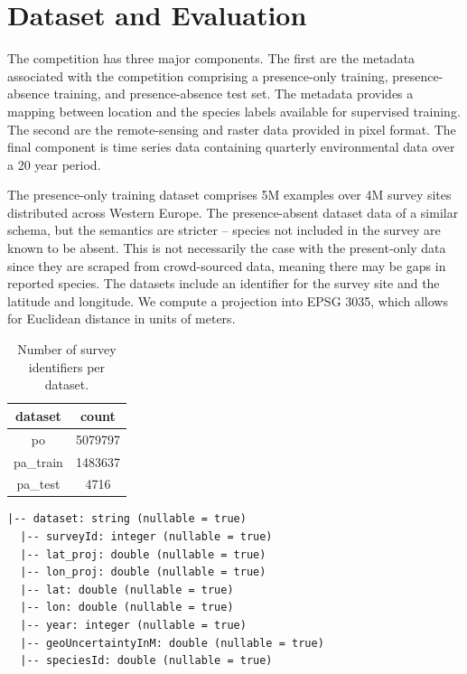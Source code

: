 \section{Dataset and Evaluation}

The competition has three major components. 
The first are the metadata associated with the competition comprising a presence-only training, presence-absence training, and presence-absence test set. 
The metadata provides a mapping between location and the species labels available for supervised training. 
The second are the remote-sensing and raster data provided in pixel format. 
The final component is time series data containing quarterly environmental data over a 20 year period. 

The presence-only training dataset comprises 5M examples over 4M survey sites distributed across Western Europe.
The presence-absent dataset data of a similar schema, but the semantics are stricter -- species not included in the survey are known to be absent. 
This is not necessarily the case with the present-only data since they are scraped from crowd-sourced data, meaning there may be gaps in reported species. 
The datasets include an identifier for the survey site and the latitude and longitude. 
We compute a projection into EPSG 3035, which allows for Euclidean distance in units of meters. 

\begin{table}[ht]
\centering
\caption{Number of survey identifiers per dataset.}
\label{lst:counts}
\begin{tabular}{|c|c|}
\hline
dataset   & count   \\ \hline
po        & 5079797 \\ \hline
pa\_train & 1483637 \\ \hline
pa\_test  & 4716    \\ \hline
\end{tabular}
\end{table}

\begin{lstlisting}[caption={Schema of the metadata.}, captionpos=b,label={lst:schema},frame=single]
  |-- dataset: string (nullable = true)
  |-- surveyId: integer (nullable = true)
  |-- lat_proj: double (nullable = true)
  |-- lon_proj: double (nullable = true)
  |-- lat: double (nullable = true)
  |-- lon: double (nullable = true)
  |-- year: integer (nullable = true)
  |-- geoUncertaintyInM: double (nullable = true)
  |-- speciesId: double (nullable = true) 
\end{lstlisting}

